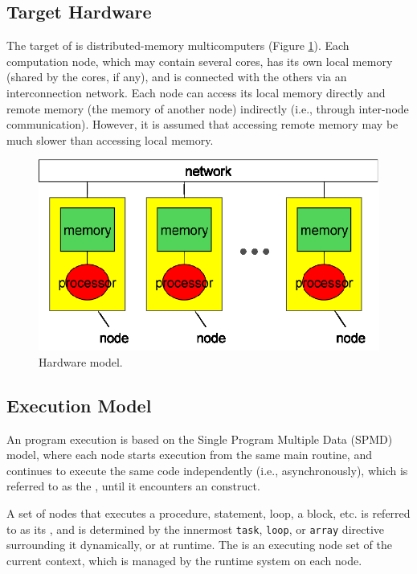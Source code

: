 \subsection{Target Hardware}

The target of {\XMP} is distributed-memory multicomputers (Figure
\ref{fig1}). Each computation node, which may contain several cores, has
its own local memory (shared by the cores, if any), and is connected
with the others via an interconnection network.
%
Each node can access its local memory directly and remote memory (the
memory of another node) indirectly (i.e., through inter-node 
communication). However, it is assumed that accessing remote memory may
be much slower than accessing local memory.

\begin{figure}
  \centering
  \includegraphics[width=12cm]{figs/Fig1.eps}
  \caption{Hardware model.}\label{fig1}
\end{figure}


\subsection{Execution Model}

An {\XMP} program execution is based on the Single Program Multiple Data
(SPMD) model, where each node starts execution from the same main
routine, and continues to execute the same code independently
(i.e., asynchronously), which is referred to as the {\it {}}, until it encounters an {\XMP} construct.

A set of nodes that executes a procedure, statement, loop,
a block, etc. is referred to as its {\it {}}, and is
determined by the innermost {\tt task}, {\tt loop}, or {\tt array}
directive surrounding it dynamically, or at runtime.
%
The {\it {}} is an executing node set of
the current context, which is managed by the {\XMP} runtime system on
each node.

